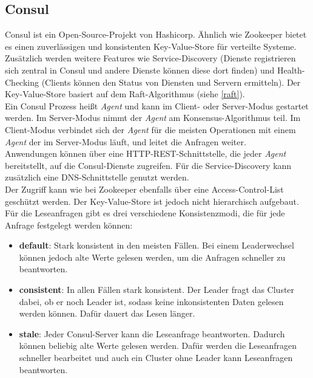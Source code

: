 \subsection{Consul}

Consul \cite{consul} ist ein Open-Source-Projekt von Hashicorp. Ähnlich wie Zookeeper bietet es einen zuverlässigen und konsistenten Key-Value-Store für verteilte Systeme. Zusätzlich werden weitere Features wie Service-Discovery (Dienste registrieren sich zentral in Consul und andere Dienste können diese dort finden) und Health-Checking (Clients können den Status von Diensten und Servern ermitteln). Der Key-Value-Store basiert auf dem Raft-Algorithmus (siehe \ref{raft}). \\
Ein Consul Prozess heißt \textit{Agent} und kann im Client- oder Server-Modus gestartet werden. Im Server-Modus nimmt der \textit{Agent} am Konsensus-Algorithmus teil. Im Client-Modus verbindet sich der \textit{Agent} für die meisten Operationen mit einem \textit{Agent} der im Server-Modus läuft, und leitet die Anfragen weiter. \\
Anwendungen können über eine HTTP-REST-Schnittstelle, die jeder \textit{Agent} bereitstellt, auf die Consul-Dienste zugreifen. Für die Service-Discovery kann zusätzlich eine DNS-Schnittstelle genutzt werden.\\
Der Zugriff kann wie bei Zookeeper ebenfalls über eine Access-Control-List geschützt werden. Der Key-Value-Store ist jedoch nicht hierarchisch aufgebaut. \\
Für die Leseanfragen gibt es drei verschiedene Konsistenzmodi, die für jede Anfrage festgelegt werden können:

\begin{itemize}
	\item \textbf{default}: Stark konsistent in den meisten Fällen. Bei einem Leaderwechsel können jedoch alte Werte gelesen werden, um die Anfragen schneller zu beantworten.
	\item \textbf{consistent}: In allen Fällen stark konsistent. Der Leader fragt das Cluster dabei, ob er noch Leader ist, sodass keine inkonsistenten Daten gelesen werden können. Dafür dauert das Lesen länger.
	\item \textbf{stale}: Jeder Consul-Server kann die Leseanfrage beantworten. Dadurch können beliebig alte Werte gelesen werden. Dafür werden die Leseanfragen schneller bearbeitet und auch ein Cluster ohne Leader kann Leseanfragen beantworten.
\end{itemize}

